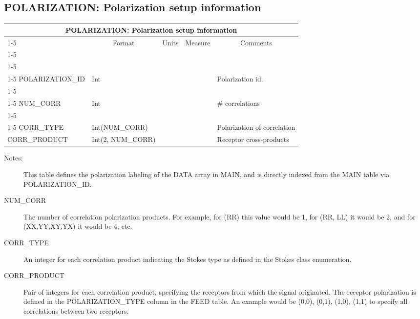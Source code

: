 \documentclass{article}
\newcommand{\defline}[1]{\cline{1-5}
\multicolumn{5}{|l|}{#1} \\
\cline{1-5}}
\newcommand{\definetable}[2]
{
	\vfill\newpage
	\subsection{#1}
        \vspace{0.15in}
        \small
	\begin{tabular}{|l|p{1.25in}|l|p{.9in}|p{1.4in}|}
	\hline
	\multicolumn{5}{|c|}{\bf #1}\\ 
	\cline{1-5}
        \multicolumn{1}{|c|}{Name}&\multicolumn{1}{|c|}{Format}&
        \multicolumn{1}{|c|}{Units}&\multicolumn{1}{|c|}{Measure}&
        \multicolumn{1}{|c|}{Comments}\\
        \cline{1-5}
        #2
        \hline
	\end{tabular}
}
\begin{document}
\definetable{POLARIZATION: Polarization setup information}{
\defline{\bf Columns}
\defline{\em Key}
POLARIZATION\_ID & Int & & & Polarization id.\\
\defline{\em Data description columns}
NUM\_CORR   &     Int  &           &        & \# correlations\\
\defline{\em Data}  
CORR\_TYPE & Int(NUM\_CORR) & & & Polarization of correlation \\
CORR\_PRODUCT &  Int(2, NUM\_CORR) &  & & Receptor cross-products \\  
}
\begin{description}

\item[Notes:] This table defines the polarization labeling of the DATA
array in MAIN, and is directly indexed from the MAIN
table via POLARIZATION\_ID.

\item[NUM\_CORR] The number of correlation polarization products. For
example, for (RR) this value would be 1, for (RR, LL) it would be 2,
and for (XX,YY,XY,YX) it would be 4, etc.

\item[CORR\_TYPE] An integer for each correlation product indicating
the Stokes type as defined in the Stokes class enumeration.

\item[CORR\_PRODUCT] Pair of integers for each correlation product,
specifying the receptors from which the signal originated.  The
receptor polarization is defined in the POLARIZATION\_TYPE column in
the FEED table. An example would be (0,0), (0,1), (1,0), (1,1) to
specify all correlations between two receptors.

\end{description}
\end{document}
